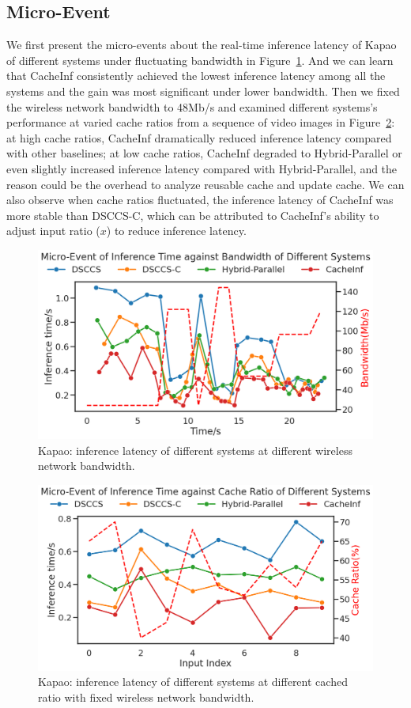 \subsection{Micro-Event}
We first present the micro-events about the real-time inference latency of Kapao of different systems under fluctuating bandwidth in Figure~\ref{fig:micro_e2e}.
And we can learn that CacheInf consistently achieved the lowest inference latency among all the systems and the gain was most significant under lower bandwidth.
Then we fixed the wireless network bandwidth to 48Mb/s and examined different systems's performance at varied cache ratios from a sequence of video images in Figure~\ref{fig:micro_ratio}: at high cache ratios, CacheInf dramatically reduced inference latency compared with other baselines; at low cache ratios, CacheInf degraded to Hybrid-Parallel or even slightly increased inference latency compared with Hybrid-Parallel, and the reason could be the overhead to analyze reusable cache and update cache.
We can also observe when cache ratios fluctuated, the inference latency of CacheInf was more stable than DSCCS-C, which can be attributed to CacheInf's ability to adjust input ratio ($x$) to reduce inference latency.

\begin{figure}[htb]
    \includegraphics[width=0.8\linewidth]{fig/MicroEvent2.png}
    \caption[short]{Kapao: inference latency of different systems at different wireless network bandwidth.}
    \label{fig:micro_e2e}
\end{figure}


\begin{figure}[htb]
    \includegraphics[width=0.8\linewidth]{fig/MicroEvent3.png}
    \caption[short]{Kapao: inference latency of different systems at different cached ratio with fixed wireless network bandwidth.}
    \label{fig:micro_ratio}
\end{figure}

